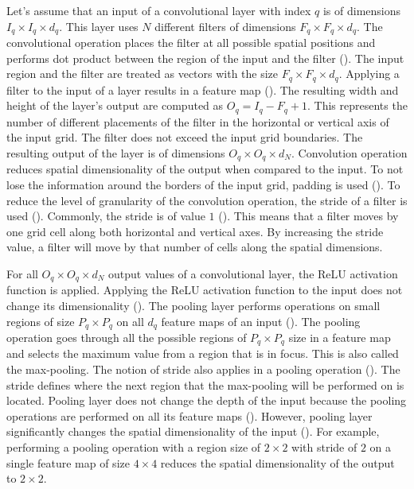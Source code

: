 \documentclass{BachelorBUI}
\begin{document}
                Let's assume that an input of a convolutional layer with index $q$ is of dimensions $I_{q} \times I_{q} \times d_q$. This layer uses $N$ different filters of dimensions $F_{q} \times F_{q} \times d_q$. The convolutional operation places the filter at all possible spatial positions and performs dot product between the region of the input and the filter (\cite{Aggarwal:2018}). The input region and the filter are treated as vectors with the size $F_{q} \times F_{q} \times d_q$. Applying a filter to the input of a layer results in a feature map (\cite{Aggarwal:2018}). The resulting width and height of the layer's output are computed as $O_{q} = I_{q} - F_{q} + 1$. This represents the number of different placements of the filter in the horizontal or vertical axis of the input grid. The filter does not exceed the input grid boundaries. The resulting output of the layer is of dimensions $O_{q} \times O_{q} \times d_N$. Convolution operation reduces spatial dimensionality of the output when compared to the input. To not lose the information around the borders of the input grid, padding is used (\cite{Aggarwal:2018}). To reduce the level of granularity of the convolution operation, the stride of a filter is used (\cite{Aggarwal:2018}). Commonly, the stride is of value $1$ (\cite{Aggarwal:2018}). This means that a filter moves by one grid cell along both horizontal and vertical axes. By increasing the stride value, a filter will move by that number of cells along the spatial dimensions.

                For all $O_{q} \times O_{q} \times d_N$ output values of a convolutional layer, the ReLU activation function is applied. Applying the ReLU activation function to the input does not change its dimensionality (\cite{Aggarwal:2018}). The pooling layer performs operations on small regions of size $P_{q} \times P_{q}$ on all $d_{q}$ feature maps of an input (\cite{Aggarwal:2018}). The pooling operation goes through all the possible regions of $P_{q} \times P_{q}$ size in a feature map and selects the maximum value from a region that is in focus. This is also called the max-pooling. The notion of stride also applies in a pooling operation (\cite{Aggarwal:2018}). The stride defines where the next region that the max-pooling will be performed on is located. Pooling layer does not change the depth of the input because the pooling operations are performed on all its feature maps (\cite{Aggarwal:2018}). However, pooling layer significantly changes the spatial dimensionality of the input (\cite{Aggarwal:2018}). For example, performing a pooling operation with a region size of $2 \times 2$ with stride of $2$ on a single feature map of size $4 \times 4$ reduces the spatial dimensionality of the output to $2 \times 2$.
\end{document}
